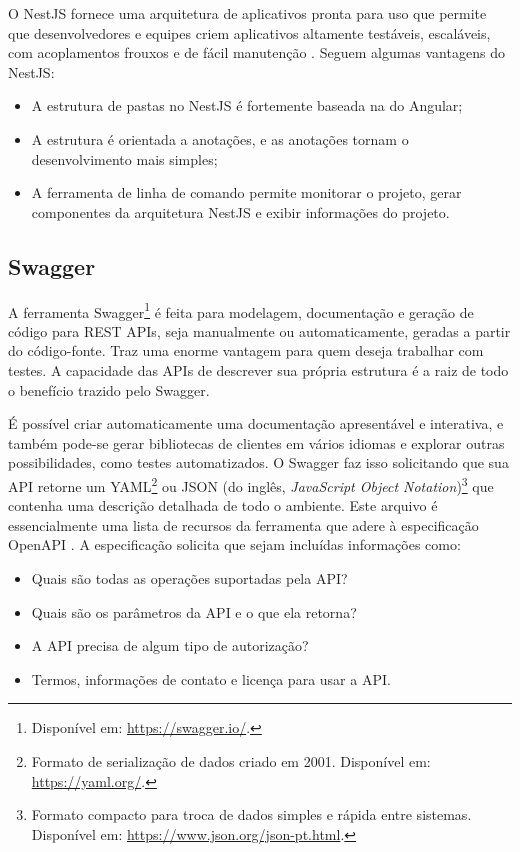 O NestJS fornece uma arquitetura de aplicativos pronta para uso que permite que desenvolvedores e equipes criem aplicativos altamente testáveis, escaláveis, com acoplamentos frouxos e de fácil manutenção \cite{kamil2020nestjs}. Seguem algumas vantagens do NestJS:

\begin{itemize}
    \item A estrutura de pastas no NestJS é fortemente baseada na do Angular;
    \item A estrutura é orientada a anotações, e as anotações tornam o desenvolvimento mais simples;
    \item A ferramenta de linha de comando permite monitorar o projeto, gerar componentes da arquitetura NestJS e exibir informações do projeto.
\end{itemize}

\subsection{Swagger}
\label{ssec:Swagger}
A ferramenta Swagger\footnote{Disponível em: \url{https://swagger.io/}.} é feita para modelagem, documentação e geração de código para REST APIs, seja manualmente ou automaticamente, geradas a partir do código-fonte. Traz uma enorme vantagem para quem deseja trabalhar com testes. A capacidade das APIs de descrever sua própria estrutura é a raiz de todo o benefício trazido pelo Swagger.

É possível criar automaticamente uma documentação apresentável e interativa, e também pode-se gerar bibliotecas de clientes em vários idiomas e explorar outras possibilidades, como testes automatizados. O Swagger faz isso solicitando que sua API retorne um YAML\footnote{Formato de serialização de dados criado em 2001. Disponível em: \url{https://yaml.org/}.} ou JSON (do inglês, \textit{JavaScript Object Notation})\footnote{Formato compacto para troca de dados simples e rápida entre sistemas. Disponível em: \url{https://www.json.org/json-pt.html}.} que contenha uma descrição detalhada de todo o ambiente. Este arquivo é essencialmente uma lista de recursos da ferramenta que adere à especificação OpenAPI \cite{smartbear2020Swagger}. A especificação solicita que sejam incluídas informações como:

\begin{itemize}
    \item Quais são todas as operações suportadas pela API?
    \item Quais são os parâmetros da API e o que ela retorna?
    \item A API precisa de algum tipo de autorização?
    \item Termos, informações de contato e licença para usar a API.
\end{itemize}

